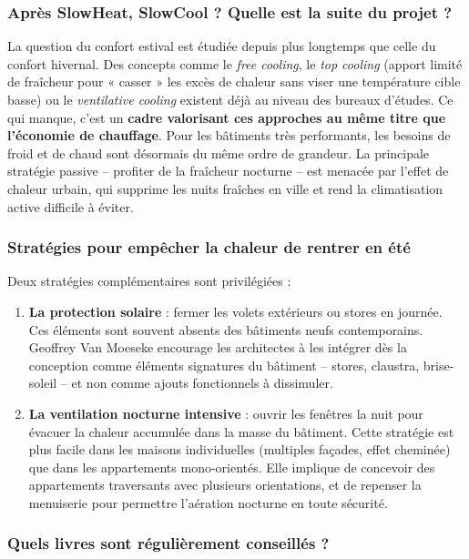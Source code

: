 \subsubsection{Après SlowHeat, SlowCool ? Quelle est la suite du projet ?}

La question du confort estival est étudiée depuis plus longtemps que celle du confort hivernal. Des concepts comme le \textit{free cooling}, le \textit{top cooling} (apport limité de fraîcheur pour « casser » les excès de chaleur sans viser une température cible basse) ou le \textit{ventilative cooling} existent déjà au niveau des bureaux d'études. Ce qui manque, c'est un \textbf{cadre valorisant ces approches au même titre que l'économie de chauffage}. Pour les bâtiments très performants, les besoins de froid et de chaud sont désormais du même ordre de grandeur. La principale stratégie passive -- profiter de la fraîcheur nocturne -- est menacée par l'effet de chaleur urbain, qui supprime les nuits fraîches en ville et rend la climatisation active difficile à éviter.

\subsubsection{Stratégies pour empêcher la chaleur de rentrer en été}

Deux stratégies complémentaires sont privilégiées :

\begin{enumerate}
    \item \textbf{La protection solaire} : fermer les volets extérieurs ou stores en journée. Ces éléments sont souvent absents des bâtiments neufs contemporains. Geoffrey Van Moeseke encourage les architectes à les intégrer dès la conception comme éléments signatures du bâtiment -- stores, claustra, brise-soleil -- et non comme ajouts fonctionnels à dissimuler.
    \item \textbf{La ventilation nocturne intensive} : ouvrir les fenêtres la nuit pour évacuer la chaleur accumulée dans la masse du bâtiment. Cette stratégie est plus facile dans les maisons individuelles (multiples façades, effet cheminée) que dans les appartements mono-orientés. Elle implique de concevoir des appartements traversants avec plusieurs orientations, et de repenser la menuiserie pour permettre l'aération nocturne en toute sécurité.
\end{enumerate}

\subsubsection{Quels livres sont régulièrement conseillés ?}

